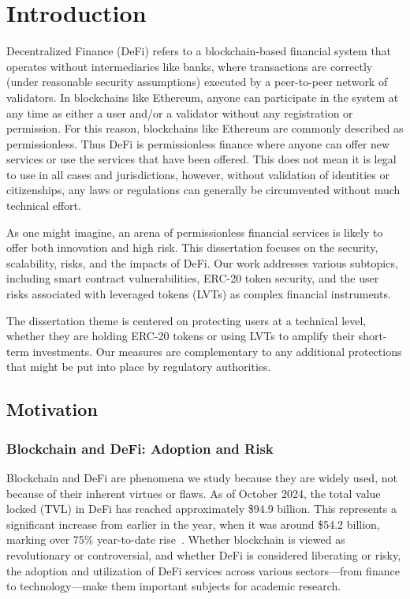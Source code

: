 
\chapter{Introduction}

Decentralized Finance (DeFi) refers to a blockchain-based financial system that operates without intermediaries like banks, where transactions are correctly (under reasonable security assumptions) executed by a peer-to-peer network of validators. In blockchains like Ethereum, anyone can participate in the system at any time as either a user and/or a validator without any registration or permission. For this reason, blockchains like Ethereum are commonly described as permissionless. Thus DeFi is permissionless finance where anyone can offer new services or use the services that have been offered. This does not mean it is legal to use in all cases and jurisdictions, however, without validation of identities or citizenships, any laws or regulations can generally be circumvented without much technical effort.

As one might imagine, an arena of permissionless financial services is likely to offer both innovation and high risk. This dissertation focuses on the security, scalability, risks, and the impacts of DeFi. Our work addresses various subtopics, including smart contract vulnerabilities, ERC-20 token security, and the user risks associated with leveraged tokens (LVTs) as complex financial instruments. 

The dissertation theme is centered on protecting users at a technical level, whether they are holding ERC-20 tokens or using LVTs to amplify their short-term investments. Our measures are complementary to any additional protections that might be put into place by regulatory authorities. 

\section{Motivation}
\subsection{Blockchain and DeFi: Adoption and Risk}
Blockchain and DeFi are phenomena we study because they are widely used, not because of their inherent virtues or flaws. As of October 2024, the total value locked (TVL) in DeFi has reached approximately \$94.9 billion. This represents a significant increase from earlier in the year, when it was around \$54.2 billion, marking over 75\% year-to-date rise~\cite{coingecko2024,binance2024}. Whether blockchain is viewed as revolutionary or controversial, and whether DeFi is considered liberating or risky, the adoption and utilization of DeFi services across various sectors—from finance to technology—make them important subjects for academic research. 

